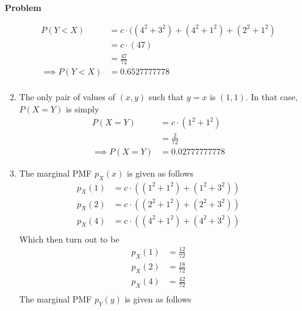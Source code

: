 \documentclass[12pt]{article}
\newenvironment{Ex}{\textbf{Problem}\vspace{.75em}\\}{}
\begin{document}
\begin{enumerate}
\begin{Ex}
\begin{solution}
\begin{enumerate}
\begin{equation}
            \label{eq:2b-sol}
            \begin{aligned}
              P(Y<X) &= c\cdot((4^2+3^2) + (4^2+1^2) + (2^2+1^2) \\
              &= c\cdot(47) \\
              &= \frac{47}{72} \\
              \implies P(Y<X) &= 0.6527777778 \\
            \end{aligned}
          \end{equation}
        \item The only pair of values of $(x,y)$ such that $y=x$ is
          $(1,1)$. In that case, $P(X=Y)$ is simply
          \begin{equation}
            \label{eq:2c-sol}
            \begin{aligned}
              P(X=Y) &= c\cdot(1^2 + 1^2) \\
               &= \frac{2}{72} \\
               \implies P(X=Y) &= 0.02777777778
            \end{aligned}
          \end{equation}
        \item The marginal PMF $p_X(x)$ is given as follows
          \begin{equation}
            \label{eq:2d-marginal-x}
            \begin{aligned}
              p_X(1) &= c\cdot((1^2+1^2) + (1^2+3^2)) \\
              p_X(2) &= c\cdot((2^2+1^2) + (2^2+3^2)) \\
              p_X(4) &= c\cdot((4^2+1^2) + (4^2+3^2)) \\
            \end{aligned}
          \end{equation}
          Which then turn out to be
          \begin{equation}
            \label{eq:2d-marginal-x-values}
            \begin{aligned}
              p_X(1) &= \frac{12}{72} \\
              p_X(2) &= \frac{18}{72} \\
              p_X(4) &= \frac{42}{72} \\
            \end{aligned}
          \end{equation}
          The marginal PMF $p_Y(y)$ is given as follows
          \begin{equation}

\end{equation}
\end{enumerate}
\end{solution}
\end{Ex}
\end{enumerate}
\end{document}
